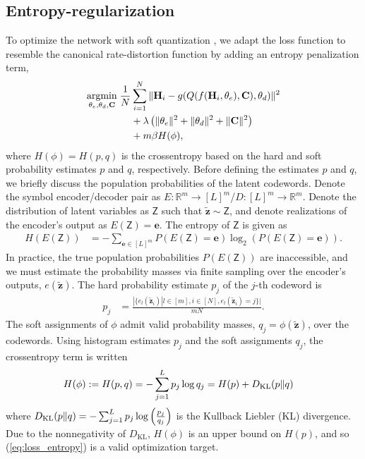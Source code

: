 \subsection{Entropy-regularization}
To optimize the network with soft quantization \cite{ref:Agustsson2017SoftToHard}, we adapt the loss function to resemble the canonical rate-distortion function by adding an entropy penalization term,
\begin{align}
\underset{\theta_e, \theta_d, \mathbf C}{\text{argmin}}\; \frac 1N &\sum_{i=1}^N\Arrowvert \mathbf H_i - g(Q(f(\mathbf H_i, \theta_e), \mathbf C), \theta_d) \Arrowvert^2 \nonumber \\
&+ \lambda \left(\Arrowvert\theta_e\Arrowvert^2+\Arrowvert\theta_d\Arrowvert^2+\Arrowvert \mathbf C \Arrowvert^2\right) \label{eq:loss_entropy} \\
&+ m\beta H(\phi), \nonumber
\end{align}
where $H(\phi)=H(p,q)$ is the crossentropy based on the hard and soft probability estimates $p$ and $q$, respectively. Before defining the estimates $p$ and $q$, we briefly discuss the population probabilities of the latent codewords. Denote the symbol encoder/decoder pair as $E:\mathbb R^m \to [L]^m$/$D:[L]^m \to \mathbb R^m$. Denote the distribution of latent variables as $\mathsf Z$ such that $\tilde{\mathbf z} \sim \mathsf Z$, and denote realizations of the encoder's output as $E(\mathsf Z)=\mathbf e$. The entropy of $\mathsf Z$ is given as 
\begin{align*}
H(E(\mathsf Z)) &= -\sum_{\mathbf e\in[L]^m}P(E(\mathsf Z) = \mathbf e)\log_2(P(E(\mathsf Z)=\mathbf e)).
\end{align*}
In practice, the true population probabilities $P(E(\mathsf Z))$ are inaccessible, and we must estimate the probability masses via finite sampling over the encoder's outputs, $e(\tilde{\mathbf z})$. The hard probability estimate $p_j$ of the $j$-th codeword is
\begin{align*}
p_j &= \frac{|\{e_l(\tilde{\mathbf z}_i)|l\in[m], i \in [N], e_l(\tilde{\mathbf z}_i)=j\}|}{mN}.
\end{align*}
The soft assignments of $\phi$ admit valid probability masses, $q_j = \phi(\tilde{\mathbf z})$, over the codewords. Using histogram estimates $p_j$ and the soft assignments $q_j$, the crossentropy term is written
\begin{align*}
H(\phi) := H(p,q) &= -\sum_{j=1}^L p_j\log q_j = H(p) + D_{\text{KL}}(p\Arrowvert q)
\end{align*}
where $D_{\text{KL}}(p\Arrowvert q)=-\sum_{j=1}^L p_j \log\left(\frac{p_j}{q_j}\right)$ is the Kullback Liebler (KL) divergence. Due to the nonnegativity of $D_{\text{KL}}$, $H(\phi)$ is an upper bound on $H(p)$, and so (\ref{eq:loss_entropy}) is a valid optimization target.

